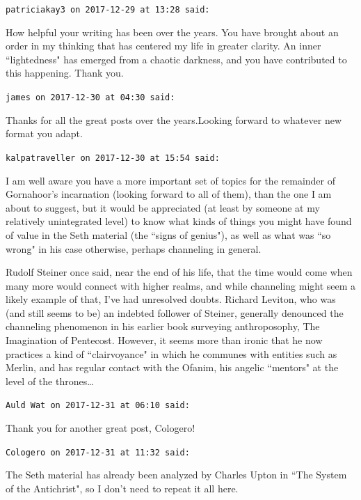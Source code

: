 \begin{footnotesize}\begin{sffamily}



\texttt{patriciakay3 on 2017-12-29 at 13:28 said: }

How helpful your writing has been over the years. You have brought about an order in my thinking that has centered my life in greater clarity. An inner ``lightedness" has emerged from a chaotic darkness, and you have contributed to this happening. Thank you.


\hfill

\texttt{james on 2017-12-30 at 04:30 said: }

Thanks for all the great posts over the years.Looking forward to whatever new format you adapt.


\hfill

\texttt{kalpatraveller on 2017-12-30 at 15:54 said: }

I am well aware you have a more important set of topics for the remainder of Gornahoor's incarnation (looking forward to all of them), than the one I am about to suggest, but it would be appreciated (at least by someone at my relatively unintegrated level) to know what kinds of things you might have found of value in the Seth material (the ``signs of genius"), as well as what was ``so wrong" in his case otherwise, perhaps channeling in general.

Rudolf Steiner once said, near the end of his life, that the time would come when many more would connect with higher realms, and while channeling might seem a likely example of that, I've had unresolved doubts. Richard Leviton, who was (and still seems to be) an indebted follower of Steiner, generally denounced the channeling phenomenon in his earlier book surveying anthroposophy, The Imagination of Pentecost. However, it seems more than ironic that he now practices a kind of ``clairvoyance" in which he communes with entities such as Merlin, and has regular contact with the Ofanim, his angelic ``mentors" at the level of the thrones…


\hfill

\texttt{Auld Wat on 2017-12-31 at 06:10 said: }

Thank you for another great post, Cologero!


\hfill

\texttt{Cologero on 2017-12-31 at 11:32 said: }

The Seth material has already been analyzed by Charles Upton in ``The System of the Antichrist", so I don't need to repeat it all here.


\end{sffamily}
\end{footnotesize}
